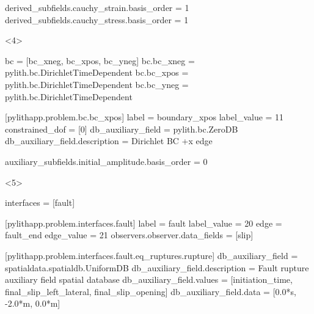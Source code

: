 \documentclass[aspectratio=169]{beamer}
\begin{document}
\begin{frame}[t,fragile]
\begin{minipage}[t]{0.67\textwidth}
\begin{onlyenv}
\begin{cfgcode}
        derived_subfields.cauchy_strain.basis_order = 1
        derived_subfields.cauchy_stress.basis_order = 1
      \end{cfgcode}
    \end{onlyenv}
    \begin{onlyenv}<4>
      \begin{cfgcode}
        bc = [bc_xneg, bc_xpos, bc_yneg]
        bc.bc_xneg = pylith.bc.DirichletTimeDependent
        bc.bc_xpos = pylith.bc.DirichletTimeDependent
        bc.bc_yneg = pylith.bc.DirichletTimeDependent
        
        [pylithapp.problem.bc.bc_xpos]
        label = boundary_xpos
        label_value = 11
        constrained_dof = [0]
        db_auxiliary_field = pylith.bc.ZeroDB
        db_auxiliary_field.description = Dirichlet BC +x edge

        auxiliary_subfields.initial_amplitude.basis_order = 0 
      \end{cfgcode}
    \end{onlyenv}
    \begin{onlyenv}<5>
      \begin{cfgcode}
        interfaces = [fault]

        [pylithapp.problem.interfaces.fault]
        label = fault
        label_value = 20
        edge = fault_end
        edge_value = 21
        observers.observer.data_fields = [slip]

        [pylithapp.problem.interfaces.fault.eq_ruptures.rupture]
        db_auxiliary_field = spatialdata.spatialdb.UniformDB
        db_auxiliary_field.description = Fault rupture auxiliary field spatial database
        db_auxiliary_field.values = [initiation_time, final_slip_left_lateral, final_slip_opening]
        db_auxiliary_field.data = [0.0*s, -2.0*m, 0.0*m]
      \end{cfgcode}
    \end{onlyenv}
  \end{minipage}

  
\end{frame}
\end{document}

